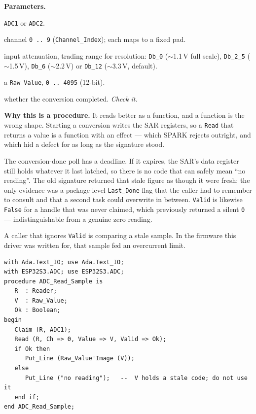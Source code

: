 \textbf{Parameters.}
\begin{description}[style=nextline]
\item[\texttt{Unit}] \texttt{ADC1} or \texttt{ADC2}.
\item[\texttt{Ch}] channel \texttt{0\,..\,9} (\texttt{Channel\_Index}); each maps to
  a fixed pad.
\item[\texttt{Atten}] input attenuation, trading range for resolution:
  \texttt{Db\_0} ($\sim$1.1\,V full scale), \texttt{Db\_2\_5} ($\sim$1.5\,V),
  \texttt{Db\_6} ($\sim$2.2\,V) or \texttt{Db\_12} ($\sim$3.3\,V, default).
\item[\texttt{Value}] a \texttt{Raw\_Value}, \texttt{0\,..\,4095} (12-bit).
\item[\texttt{Valid}] whether the conversion completed. \emph{Check it.}
\end{description}

\textbf{Why this is a procedure.} It reads better as a function, and a function
is the wrong shape. Starting a conversion writes the SAR registers, so a
\texttt{Read} that returns a value is a function with an effect --- which SPARK
rejects outright, and which hid a defect for as long as the signature stood.

The conversion-done poll has a deadline. If it expires, the SAR's data register
still holds whatever it last latched, so there is no code that can safely mean
``no reading''. The old signature returned that stale figure as though it were
fresh; the only evidence was a package-level \texttt{Last\_Done} flag that the
caller had to remember to consult and that a second task could overwrite in
between. \texttt{Valid} is likewise \texttt{False} for a handle that was never
claimed, which previously returned a silent \texttt{0} --- indistinguishable
from a genuine zero reading.

A caller that ignores \texttt{Valid} is comparing a stale sample. In the
firmware this driver was written for, that sample fed an overcurrent limit.

\begin{lstlisting}
with Ada.Text_IO; use Ada.Text_IO;
with ESP32S3.ADC; use ESP32S3.ADC;
procedure ADC_Read_Sample is
   R  : Reader;
   V  : Raw_Value;
   Ok : Boolean;
begin
   Claim (R, ADC1);
   Read (R, Ch => 0, Value => V, Valid => Ok);
   if Ok then
      Put_Line (Raw_Value'Image (V));
   else
      Put_Line ("no reading");   --  V holds a stale code; do not use it
   end if;
end ADC_Read_Sample;
\end{lstlisting}

